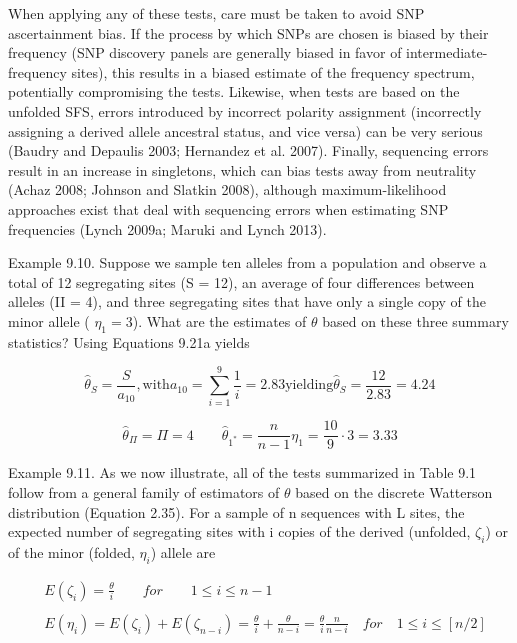 \documentclass{article}
\begin{document}
When applying any of these tests, care must be taken to avoid SNP ascertainment bias. If the process by which SNPs are chosen is biased by their frequency (SNP discovery panels are generally biased in favor of intermediate-frequency sites), this results in a biased estimate of the frequency spectrum, potentially compromising the tests. Likewise, when tests are based on the unfolded SFS, errors introduced by incorrect polarity assignment (incorrectly assigning a derived allele ancestral status, and vice versa) can be very serious (Baudry and Depaulis 2003; Hernandez et al. 2007). Finally, sequencing errors result in an increase in singletons, which can bias tests away from neutrality (Achaz 2008; Johnson and Slatkin 2008), although maximum-likelihood approaches exist that deal with sequencing errors when estimating SNP frequencies (Lynch 2009a; Maruki and Lynch 2013).

Example 9.10. Suppose we sample ten alleles from a population and observe a total of 12 segregating sites (S = 12), an average of four differences between alleles (II = 4), and three segregating sites that have only a single copy of the minor allele ( $ \eta_1 = 3 $). What are the estimates of  $ \theta $ based on these three summary statistics? Using Equations 9.21a yields

\begin{equation}
\widehat{\theta}_{S}=\frac{S}{a_{10}},\mathrm{w i t h}a_{10}=\sum_{i=1}^{9}\frac{1}{i}=2.83\mathrm{y i e l d i n g}\widehat{\theta}_{S}=\frac{12}{2.83}=4.24
\end{equation}

\begin{equation}
\widehat{\theta}_{\Pi}=\Pi=4\qquad\widehat{\theta}_{1^{*}}=\frac{n}{n-1}\eta_{1}=\frac{10}{9}\cdot3=3.33
\end{equation}

Example 9.11. As we now illustrate, all of the tests summarized in Table 9.1 follow from a general family of estimators of  $ \theta $ based on the discrete Watterson distribution (Equation 2.35). For a sample of n sequences with L sites, the expected number of segregating sites with i copies of the derived (unfolded,  $ \zeta_i $) or of the minor (folded,  $ \eta_i $) allele are

\begin{equation}
\begin{aligned}&E(\zeta_{i})=\frac{\theta}{i}\qquad for\qquad1\leq i\leq n-1\\ &\\ &E(\eta_{i})=E(\zeta_{i})+E(\zeta_{n-i})=\frac{\theta}{i}+\frac{\theta}{n-i}=\frac{\theta}{i}\frac{n}{n-i}\quad for\quad1\leq i\leq[n/2]\\ \end{aligned}
\tag{9.22a}
\label{eq:9_22a}
\end{equation}
\end{document}
